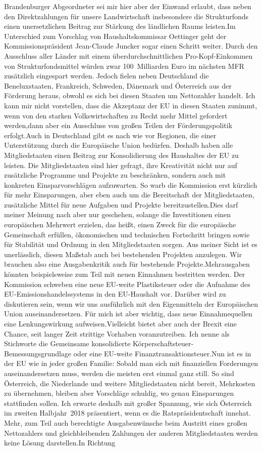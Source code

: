 \documentclass{article}
\begin{document}
Brandenburger Abgeordneter sei mir hier aber der Einwand erlaubt, dass neben den Direktzahlungen für unsere Landwirtschaft insbesondere die Strukturfonds einen unersetzlichen Beitrag zur Stärkung des ländlichen Raums leisten.Im Unterschied zum Vorschlag von Haushaltskommissar Oettinger geht der Kommissionspräsident Jean-­Claude Juncker sogar einen Schritt weiter. Durch den Ausschluss aller Länder mit einem überdurchschnittlichen Pro-Kopf-Einkommen von Strukturfondsmittel würden zwar 100 Milliarden Euro im nächsten MFR zusätzlich eingespart werden. Jedoch fielen neben Deutschland die Beneluxstaaten, Frankreich, Schweden, Dänemark und Österreich aus der Förderung heraus, obwohl es sich bei diesen Staaten um Nettozahler handelt. Ich kann mir nicht vorstellen, dass die Akzeptanz der EU in diesen Staaten zunimmt, wenn von den starken Volkswirtschaften zu Recht mehr Mittel gefordert werden,dann aber ein Ausschluss von großen Teilen der Förderungspolitik erfolgt.Auch in Deutschland gibt es nach wie vor Regionen, die einer Unterstützung durch die Europäische Union bedürfen. Deshalb haben alle Mitgliedstaaten einen Beitrag zur Konsolidierung des Haushaltes der EU zu leisten. Die Mitgliedstaaten sind hier gefragt, ihre Kreativität nicht nur auf zusätzliche Programme und Projekte zu beschränken, sondern auch mit konkreten Einsparvorschlägen aufzuwarten. So warb die Kommission erst kürzlich für mehr Einsparungen, aber eben auch um die Bereitschaft der Mitgliedstaaten, zusätzliche Mittel für neue Aufgaben und Projekte bereitzustellen.Dies darf meiner Meinung nach aber nur geschehen, solange die Investitionen einen europäischen Mehrwert erzielen, das heißt, einen Zweck für die europäische Gemeinschaft erfüllen, ökonomischen und technischen Fortschritt bringen sowie für Stabilität und Ordnung in den Mitgliedstaaten sorgen. Aus meiner Sicht ist es unerlässlich, diesen Maßstab auch bei bestehenden Projekten anzulegen. Wir brauchen also eine Ausgabenkritik auch für bestehende Projekte.Mehrausgaben könnten beispielsweise zum Teil mit neuen Einnahmen bestritten werden. Der Kommission schweben eine neue EU-weite Plastiksteuer oder die Aufnahme des EU-Emissionshandelssystems in den EU-Haushalt vor. Darüber wird zu diskutieren sein, wenn wir uns ausführlich mit den Eigenmitteln der Europäischen Union auseinandersetzen. Für mich ist aber wichtig, dass neue Einnahmequellen eine Lenkungswirkung aufweisen.Vielleicht bietet aber auch der Brexit eine Chance, seit langer Zeit strittige Vorhaben voranzutreiben. Ich nenne als Stichworte die Gemeinsame konsolidierte Körperschaftsteuer-Bemessungsgrundlage oder eine EU-weite Finanztransaktionsteuer.Nun ist es in der EU wie in jeder großen Familie: Sobald man sich mit finanziellen Forderungen auseinandersetzen muss, werden die meisten erst einmal ganz still. So sind Österreich, die Niederlande und weitere Mitgliedstaaten nicht bereit, Mehrkosten zu übernehmen, bleiben aber Vorschläge schuldig, wo genau Einsparungen stattfinden sollen. Ich erwarte deshalb mit großer Spannung, wie sich Österreich im zweiten Halbjahr 2018 präsentiert, wenn es die Ratspräsidentschaft innehat. Mehr, zum Teil auch berechtigte Ausgabenwünsche beim Austritt eines großen Nettozahlers und gleichbleibenden Zahlungen der anderen Mitgliedstaaten werden keine Lösung darstellen.In Richtung 
\end{document}
